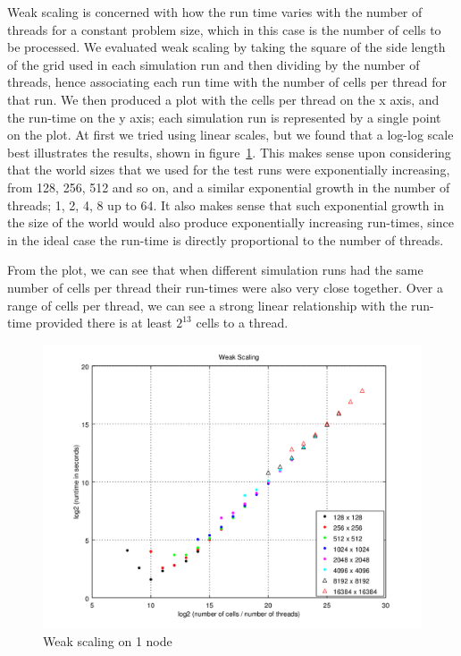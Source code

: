 \documentclass[a4paper]{article}
\begin{document}
Weak scaling is concerned with how the run time varies with the number of threads for a constant problem size, which in this case is the number of cells to be processed.
We evaluated weak scaling by taking the square of the side length of the grid used in each simulation run and then dividing by the number of threads, hence associating each run time with the number of cells per thread for that run.
We then produced a plot with the cells per thread on the x axis, and the run-time on the y axis; each simulation run is represented by a single point on the plot.
At first we tried using linear scales, but we found that a log-log scale best illustrates the results, shown in figure~\ref{weakscaling}.
This makes sense upon considering that the world sizes that we used for the test runs were exponentially increasing, from 128, 256, 512 and so on, and a similar exponential growth in the number of threads; 1, 2, 4, 8 up to 64.
It also makes sense that such exponential growth in the size of the world would also produce exponentially increasing run-times, since in the ideal case the run-time is directly proportional to the number of threads.

From the plot, we can see that when different simulation runs had the same number of cells per thread their run-times were also very close together.
Over a range of cells per thread, we can see a strong linear relationship with the run-time provided there is at least $2^{13}$ cells to a thread.

\begin{figure}
    \centering
    \includegraphics[width=\textwidth]{weak-scaling}
    \caption{Weak scaling on 1 node}
	\label{weakscaling}
\end{figure}
\end{document}

